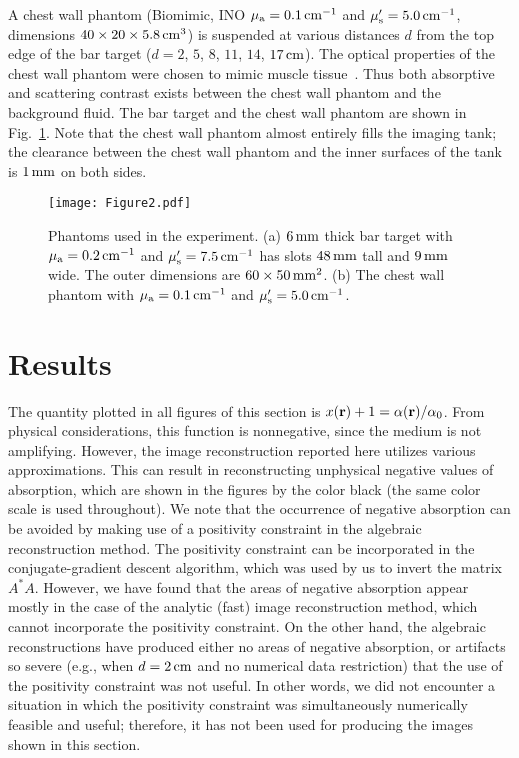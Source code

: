 A chest wall phantom (Biomimic, INO $\mu_{\rm a} = 0.1\,{\rm cm}^{-1}$ and $\mu_{\rm s}^\prime = 5.0\,{\rm cm}^{-1}$, dimensions $40\times 20\times 5.8\,{\rm cm}^3$) is suspended at various distances $d$ from the top edge of the bar target ($d=2$, $5$, $8$, $11$, $14$, $17\,{\rm cm}$). The optical properties of the chest wall phantom were chosen to mimic muscle tissue~\cite{ardeshirpour_10_1, kienle_99_1,taroni_03_1}.  Thus both absorptive and scattering contrast exists between the chest wall
phantom and the background fluid. The bar target and the chest wall phantom are shown in Fig.~\ref{fig:targets}.  Note that the chest wall phantom almost entirely fills the imaging tank; the clearance between the chest wall phantom and the inner surfaces of the tank is $1\,{\rm mm}$ on both sides.

\begin{figure}[t]
\centering\texttt{[image: Figure2.pdf]}
\caption{\label{fig:targets}
Phantoms used in the experiment. (a) $6\,{\rm mm}$ thick bar target with $\mu_{\rm a}=0.2\,{\rm cm}^{-1}$ and $\mu_{\rm s}^{\prime}=7.5\,{\rm cm}^{-1}$ has slots $48\,{\rm mm}$ tall and $9\,{\rm mm}$ wide. The outer dimensions are $60\times 50\,{\rm mm}^2$. (b) The chest wall phantom with $\mu_{\rm a}=0.1\,{\rm cm}^{-1}$ and $\mu_{\rm s}^{\prime}=5.0\,{\rm cm}^{-1}$.  }
\end{figure}


\section{Results}
\label{sec:3_results}

The quantity plotted in all figures of this section is $x({\bf r}) + 1 = \alpha({\bf r}) / \alpha_0$. From physical considerations, this function is nonnegative, since the medium is not amplifying.  However,
the image reconstruction reported here utilizes various approximations. This can result in reconstructing unphysical negative values of absorption, which are shown in the figures by the color black (the same color scale is used throughout). We note that the occurrence of negative absorption can be avoided by making use of a positivity constraint in the algebraic reconstruction method. The positivity constraint can be incorporated in the conjugate-gradient descent algorithm, which was used by us to invert the matrix $A^*A$. However, we have found that the areas of negative absorption appear mostly in the case of the analytic (fast) image reconstruction method, which cannot incorporate the positivity constraint. On the other hand, the algebraic reconstructions have produced either no areas of negative absorption, or artifacts so severe (e.g., when $d=2\,{\rm cm}$ and no numerical data restriction) that the use of the
positivity constraint was not useful. In other words, we did not encounter a situation in which the positivity constraint was simultaneously numerically feasible and useful; therefore, it has not been used for producing the images shown in this section.

